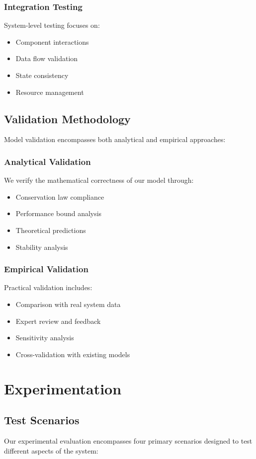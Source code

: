 \documentclass[12pt]{article}
\begin{document}
\subsubsection{Integration Testing}
System-level testing focuses on:
\begin{itemize}[noitemsep]
    \item Component interactions
    \item Data flow validation
    \item State consistency
    \item Resource management
\end{itemize}

\subsection{Validation Methodology}
Model validation encompasses both analytical and empirical approaches:

\subsubsection{Analytical Validation}
We verify the mathematical correctness of our model through:
\begin{itemize}[noitemsep]
    \item Conservation law compliance
    \item Performance bound analysis
    \item Theoretical predictions
    \item Stability analysis
\end{itemize}

\subsubsection{Empirical Validation}
Practical validation includes:
\begin{itemize}[noitemsep]
    \item Comparison with real system data
    \item Expert review and feedback
    \item Sensitivity analysis
    \item Cross-validation with existing models
\end{itemize}

\section{Experimentation}
\subsection{Test Scenarios}
Our experimental evaluation encompasses four primary scenarios designed to test different aspects of the system:
\end{document}

